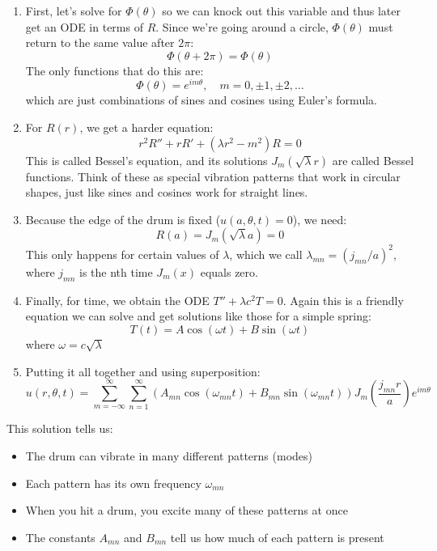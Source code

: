 \begin{example}
\begin{solution}
\begin{enumerate}
\item First, let's solve for $\Phi(\theta)$ so we can knock out this variable and thus later get an ODE in terms of $R$. Since we're going around a circle, $\Phi(\theta)$ must return to the same value after $2\pi$:
   \[
   \Phi(\theta + 2\pi) = \Phi(\theta)
   \]
   The only functions that do this are:
   \[
   \Phi(\theta) = e^{im\theta}, \quad m = 0,\pm1,\pm2,\ldots
   \]
   which are just combinations of sines and cosines using Euler's formula.

\item For $R(r)$, we get a harder equation:
   \[
   r^2R'' + rR' + (\lambda r^2 - m^2)R = 0
   \]
   This is called Bessel's equation, and its solutions $J_m(\sqrt{\lambda}r)$ are called Bessel functions. Think of these as special vibration patterns that work in circular shapes, just like sines and cosines work for straight lines.

\item Because the edge of the drum is fixed ($u(a,\theta,t) = 0$), we need:
   \[
   R(a) = J_m(\sqrt{\lambda}a) = 0
   \]
   This only happens for certain values of $\lambda$, which we call $\lambda_{mn} = (j_{mn}/a)^2$, where $j_{mn}$ is the nth time $J_m(x)$ equals zero.

\item Finally, for time, we obtain the ODE $T'' + \lambda c^2 T = 0$. Again this is a friendly equation we can solve and get solutions like those for a simple spring:
   \[
   T(t) = A\cos(\omega t) + B\sin(\omega t)
   \]
   where $\omega = c\sqrt{\lambda}$

\item Putting it all together and using superposition:
   \[
   u(r,\theta,t) = \sum_{m=-\infty}^{\infty}\sum_{n=1}^{\infty} \left(A_{mn}\cos(\omega_{mn}t) + B_{mn}\sin(\omega_{mn}t)\right)J_m\left(\frac{j_{mn}r}{a}\right)e^{im\theta}
   \]
\end{enumerate}

\noindent This solution tells us:
\begin{itemize}
    \item The drum can vibrate in many different patterns (modes)
    \item Each pattern has its own frequency $\omega_{mn}$
    \item When you hit a drum, you excite many of these patterns at once
    \item The constants $A_{mn}$ and $B_{mn}$ tell us how much of each pattern is present
\end{itemize}
\end{solution}
\end{example}
\exampleline

